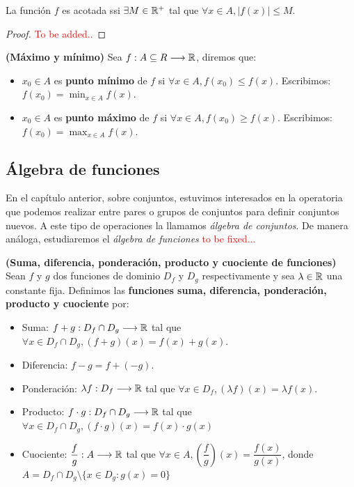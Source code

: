 \begin{proposicion}
	La función $f$ es acotada ssi $\exists M \in \mathbb{R}^+ $ tal que $\forall x \in A, |f(x) | \leq M$. 
\end{proposicion}

\begin{proof}
	\textcolor{red}{To be added..}
\end{proof}

\begin{definicion}
	\textbf{(Máximo y mínimo)}
	Sea $f: A \subseteq R \longrightarrow \mathbb{R}$, diremos que: 
	\begin{itemize}
		\item $x_0 \in A$ es \textbf{punto mínimo} de $f$ si $\forall x \in A, f(x_0 ) \leq f(x)$. Escribimos: $ f(x_0) = \min_{x\in A} f(x)$. 
		\item  $x_0 \in A$ es \textbf{punto máximo} de $f$ si $\forall x \in A, f(x_0 ) \geq f(x)$. Escribimos: $ f(x_0) = \max_{x\in A} f(x)$. 
	\end{itemize}
\end{definicion}

\subsection{Álgebra de funciones}

En el capítulo anterior, sobre conjuntos, estuvimos interesados en la operatoria que podemos realizar entre pares o grupos de conjuntos para definir conjuntos nuevos. A este tipo de operaciones la llamamos \textit{álgebra de conjuntos}. De manera análoga, estudiaremos el \textit{álgebra de funciones} \textcolor{red}{to be fixed...}

\begin{definicion}
	\textbf{(Suma, diferencia, ponderación, producto y cuociente de funciones)}
	Sean $f$ y $g$ dos funciones de dominio $D_f$ y $D_g$ respectivamente y sea $\lambda \in \mathbb{R}$ una constante fija. Definimos las \textbf{funciones suma, diferencia, ponderación, producto y cuociente} por: 
	\begin{itemize}
		\item Suma: $f + g : D_f \cap D_g \longrightarrow \mathbb{R}$ tal que $\forall x \in D_f \cap D_g, (f+g) (x) = f(x) + g(x)$. 
		\item Diferencia: $f - g = f + (-g) $. 
		\item Ponderación: $\lambda f: D_f \longrightarrow \mathbb{R}$ tal que $\forall x \in D_f , (\lambda f)(x) = \lambda f(x)$.
		\item Producto: 
		$ f\cdot g: D_f \cap D_g\longrightarrow \mathbb{R}$ tal que $\forall x \in D_f \cap D_g , (f\cdot g) (x) = f(x) \cdot g(x)$
		\item Cuociente: $\dfrac{f}{g}: A \longrightarrow \mathbb{R}$ tal que $\forall x \in A, \left(\dfrac{f}{g}\right)(x) = \dfrac{f(x)}{g(x)}$, donde $A = D_f \cap D_g \setminus \{ x \in D_g: g(x) = 0\}$ 
	\end{itemize}
\end{definicion}

